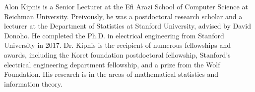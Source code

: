Alon Kipnis is a Senior Lecturer at the Efi Arazi School of Computer Science at Reichman University. Preivously, he was a postdoctoral research scholar and a lecturer at the Department of Statistics at Stanford University, advised by David Donoho. He completed the Ph.D. in electrical engineering from Stanford University in 2017. Dr. Kipnis is the recipient of numerous fellowships and awards, including the Koret foundation postdoctoral fellowship, Stanford's electrical engineering department fellowship, and a prize from the Wolf Foundation. His research is in the areas of mathematical statistics and information theory.